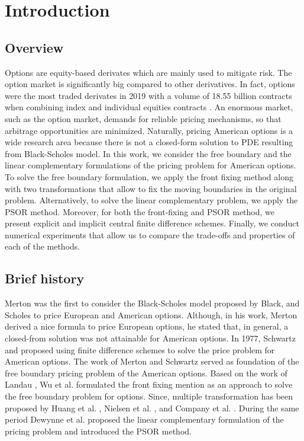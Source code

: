 \section{Introduction}

\subsection{Overview}

Options are equity-based derivates which are mainly used to mitigate risk. 
The option market is significantly big compared to other derivatives. 
In fact, options were the most traded 
derivates in 2019 with a volume of 18.55 billion contracts when combining 
index and individual equities contracts \cite{statista_2019}. 
An enormous market, such as the option market, demands for reliable pricing 
mechanisms, so that arbitrage opportunities are minimized. Naturally, pricing 
American options is a wide research area because there is not a closed-form
solution to PDE resulting from Black-Scholes model. In this work,
we consider the free boundary and the linear complementary formulations of the 
pricing problem for American options. To solve the free boundary formulation,
we apply the front fixing method along with two transformations that allow to fix
the moving boundaries in the original problem. Alternatively, to solve the linear complementary problem, we apply the PSOR 
method. Moreover, for both the front-fixing and PSOR method, we present explicit 
and implicit central finite difference schemes. Finally, we conduct numerical 
experiments that allow us to compare the trade-offs and properties of each of 
the methods.

\subsection{Brief history}

Merton \cite{merton_1973} was the first to consider the Black-Scholes model 
proposed by Black, and Scholes \cite{black_scholes_1973} to price European
and American options. Although, in his work, Merton derived a nice formula 
to price European options, he stated that, in general, a closed-from solution 
was not attainable for American options. In 1977, Schwartz \cite*{schwartz_197779}
and \cite{brennan_1997} proposed using finite difference schemes 
to solve the price problem for American options. The work of Merton and Schwartz
served as foundation of the free boundary pricing problem of the American options.
Based on the work of Landau \cite*{landau_1950_heat_ci}, 
Wu et al. \cite{wu1997front} formulated the front fixing mention as an approach 
to solve the free boundary problem for options. Since, multiple transformation has 
been proposed by Huang et al. \cite*{huang_2000}, Nielsen et al. \cite*{nielsen_2001},
and Company et al. \cite*{company_egorova_jodar_2014}. During the same period 
Dewynne et al. \cite*{dewynne_howison_rupf_wilmott_1993} proposed the linear 
complementary formulation of the pricing problem and introduced the PSOR method.

